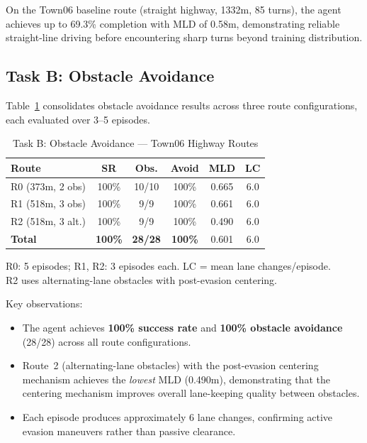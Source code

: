 \documentclass[conference]{IEEEtran}
\begin{document}
On the Town06 baseline route (straight highway, 1332m, 85 turns), the agent achieves up to 69.3\% completion with MLD of 0.58m, demonstrating reliable straight-line driving before encountering sharp turns beyond training distribution.

\subsection{Task B: Obstacle Avoidance}

Table~\ref{tab:task_b} consolidates obstacle avoidance results across three route configurations, each evaluated over 3--5 episodes.

\begin{table}[t]
\centering
\caption{Task B: Obstacle Avoidance --- Town06 Highway Routes}
\label{tab:task_b}
\begin{tabular}{lccccc}
\toprule
\textbf{Route} & \textbf{SR} & \textbf{Obs.} & \textbf{Avoid} & \textbf{MLD} & \textbf{LC} \\
\midrule
R0 (373m, 2 obs) & 100\% & 10/10 & 100\% & 0.665 & 6.0 \\
R1 (518m, 3 obs) & 100\% & 9/9 & 100\% & 0.661 & 6.0 \\
R2 (518m, 3 alt.) & 100\% & 9/9 & 100\% & 0.490 & 6.0 \\
\midrule
\textbf{Total} & \textbf{100\%} & \textbf{28/28} & \textbf{100\%} & 0.601 & 6.0 \\
\bottomrule
\end{tabular}
\vspace{1mm}
\small{R0: 5 episodes; R1, R2: 3 episodes each. LC = mean lane changes/episode.\\
R2 uses alternating-lane obstacles with post-evasion centering.}
\end{table}

Key observations:
\begin{itemize}
    \item The agent achieves \textbf{100\% success rate} and \textbf{100\% obstacle avoidance} (28/28) across all route configurations.
    \item Route~2 (alternating-lane obstacles) with the post-evasion centering mechanism achieves the \emph{lowest} MLD (0.490m), demonstrating that the centering mechanism improves overall lane-keeping quality between obstacles.
    \item Each episode produces approximately 6 lane changes, confirming active evasion maneuvers rather than passive clearance.
\end{itemize}
\end{document}
